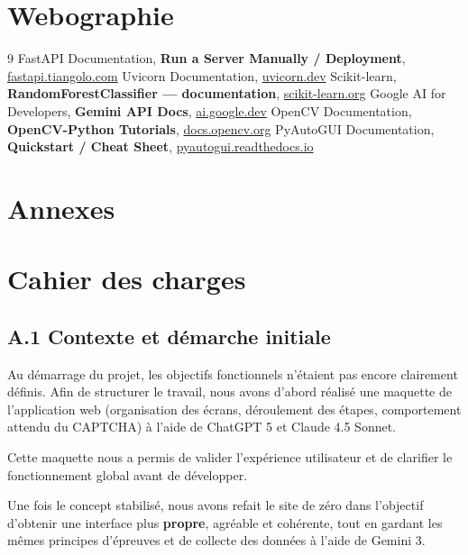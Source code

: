 \documentclass[a4paper, 12pt, twoside]{article}
\begin{document}
\section{Webographie}
\begin{thebibliography}{9}
     FastAPI Documentation, \textbf{Run a Server Manually / Deployment}, \url{fastapi.tiangolo.com}
     Uvicorn Documentation, \url{uvicorn.dev}
     Scikit-learn, \textbf{RandomForestClassifier — documentation}, \url{scikit-learn.org}
     Google AI for Developers, \textbf{Gemini API Docs}, \url{ai.google.dev}
     OpenCV Documentation, \textbf{OpenCV-Python Tutorials}, \url{docs.opencv.org}
     PyAutoGUI Documentation, \textbf{Quickstart / Cheat Sheet}, \url{pyautogui.readthedocs.io}
\end{thebibliography}

\newpage

\section{Annexes}
\appendix
\makeatletter
\def\@seccntformat#1{Annexe~\csname the#1\endcsname:\quad}
\makeatother

\section{Cahier des charges}

\subsection*{A.1 Contexte et démarche initiale}
Au démarrage du projet, les objectifs fonctionnels n'étaient pas encore clairement définis.
Afin de structurer le travail, nous avons d'abord réalisé une maquette de l'application web (organisation des écrans, déroulement des étapes, comportement attendu du CAPTCHA) à l'aide de ChatGPT 5 et Claude 4.5 Sonnet.

Cette maquette nous a permis de valider l'expérience utilisateur et de clarifier le fonctionnement global avant de développer.

Une fois le concept stabilisé, nous avons refait le site de zéro dans l'objectif d'obtenir une interface plus \textbf{propre}, agréable et cohérente, tout en gardant les mêmes principes d'épreuves et de collecte des données à l'aide de Gemini 3.
\end{document}
